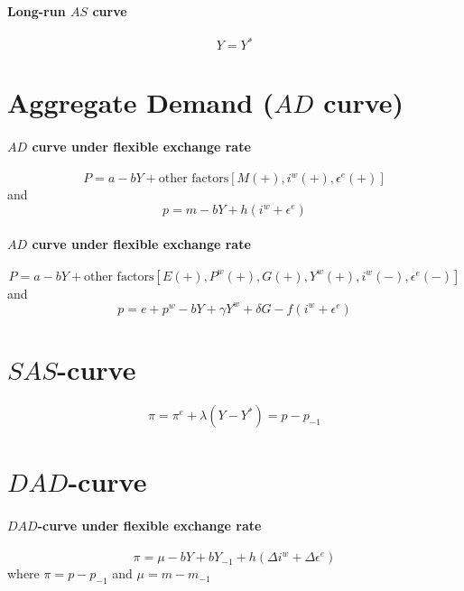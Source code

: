 \documentclass[a4paper] {scrartcl}
\begin{document}
\paragraph{Long-run $AS$ curve} %
\label{par:long_run_as_curve}
\begin{equation}
	Y = Y^*
\end{equation}

\section{Aggregate Demand ($AD$ curve)}

\paragraph{$AD$ curve under flexible exchange rate} %
\label{par:_ad_curve_under_flexible_exchange_rate}
\begin{equation}
	P = a -bY +\text{other factors}[M(+),i^w(+),\epsilon^e(+)]
\end{equation}
and
\begin{equation}
	p = m-bY+h(i^w+\epsilon^e)
\end{equation}


\paragraph{$AD$ curve under flexible exchange rate} %
\label{par:_ad_curve_under_flexible_exchange_rate}
\begin{equation}
	P = a -bY +\text{other factors}[E(+),P^w(+),G(+),Y^w(+),i^w(-),\epsilon^e(-)]
\end{equation}
and
\begin{equation}
	p = e + p^w-bY+\gamma Y^w+\delta G-f(i^w+\epsilon^e)
\end{equation}

\section{$SAS$-curve}
\begin{equation}
	\pi = \pi^e +\lambda(Y-Y^*) = p-p_{-1}
\end{equation}
\section{$DAD$-curve}
\paragraph{$DAD$-curve under flexible exchange rate} %
\label{par:_dad_curve_under_flexible_exchange_rate}

\begin{equation}
	\pi = \mu-bY+bY_{-1}+h(\Delta i^w+\Delta \epsilon^e)
\end{equation}
where $\pi = p-p_{-1}$ and $\mu=m-m_{-1}$
\end{document}
